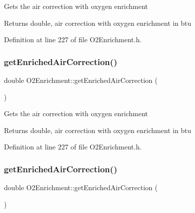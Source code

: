 Gets the air correction with oxygen enrichment \begin{DoxyReturn}{Returns}
double, air correction with oxygen enrichment in btu 
\end{DoxyReturn}


Definition at line 227 of file O2\+Enrichment.\+h.

\mbox{\label{class_o2_enrichment_a7e1eeaca64c46969c0652a46b67fad76}} 
\subsubsection{\texorpdfstring{get\+Enriched\+Air\+Correction()}{getEnrichedAirCorrection()}\hspace{0.1cm}{\footnotesize\ttfamily [2/3]}}
{\footnotesize\ttfamily double O2\+Enrichment\+::get\+Enriched\+Air\+Correction (\begin{DoxyParamCaption}{ }\end{DoxyParamCaption})\hspace{0.3cm}{\ttfamily [inline]}}

Gets the air correction with oxygen enrichment \begin{DoxyReturn}{Returns}
double, air correction with oxygen enrichment in btu 
\end{DoxyReturn}


Definition at line 227 of file O2\+Enrichment.\+h.

\mbox{\label{class_o2_enrichment_a7e1eeaca64c46969c0652a46b67fad76}} 
\subsubsection{\texorpdfstring{get\+Enriched\+Air\+Correction()}{getEnrichedAirCorrection()}\hspace{0.1cm}{\footnotesize\ttfamily [3/3]}}
{\footnotesize\ttfamily double O2\+Enrichment\+::get\+Enriched\+Air\+Correction (\begin{DoxyParamCaption}{ }\end{DoxyParamCaption})\hspace{0.3cm}{\ttfamily [inline]}}

